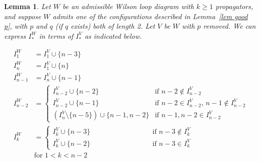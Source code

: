 \documentclass[11pt]{article}
\newtheorem{lem}[thm]{Lemma}
\theoremstyle{remark}
\theoremstyle{definition}
\begin{document}
\begin{lem}\label{lem I}
Let $W$ be an admissible Wilson loop diagram with $k\geq 1$ propagators, and suppose $W$ admits one of the configurations described in Lemma~\ref{lem good p}, with $p$ and $q$ (if $q$ exists) both of length 2. Let $V$ be $W$ with $p$ removed.  We can express $I_*^W$ in terms of $I_*^V$ as indicated below.

  \begin{align*}
    I_1^{W} & = I_1^{V} \cup \{n-3\} \\
    I_n^{W} & = I_1^{V} \cup \{n\} \\
    I_{n-1}^{W} & = I_n^{V} \cup \{n-1\} \\
    I_{n-2}^{W} & =
    \begin{cases}
      I_{n-2}^{V}\cup \{n-2\} & \text{if $n-2\not\in I_{n-2}^{V}$} \\
      I_{n-2}^{V}\cup \{n-1\} & \text{if $n-2\in I_{n-2}^{V}$, $n-1\not\in I_{n-2}^{V}$} \\
      (I_{n}^{V} \setminus \{n-5\})\cup \{n-1,n-2\} & \text{if $n-1, n-2\in I_{n-2}^{V}$}
    \end{cases} \\
    I_{k}^{W} & =
    \begin{cases}
      I_k^{V}\cup \{n-3\} & \qquad \qquad \qquad \qquad \text{if $n-3 \not\in I_k^{V}$}\\
      I_k^{V}\cup\{n-2\} & \qquad \qquad \qquad \qquad \text{if $n-3\in I_k^{V}$}
    \end{cases} \\
    & \text{for $1<k<n-2$}
  \end{align*}
\end{lem}
\end{document}
